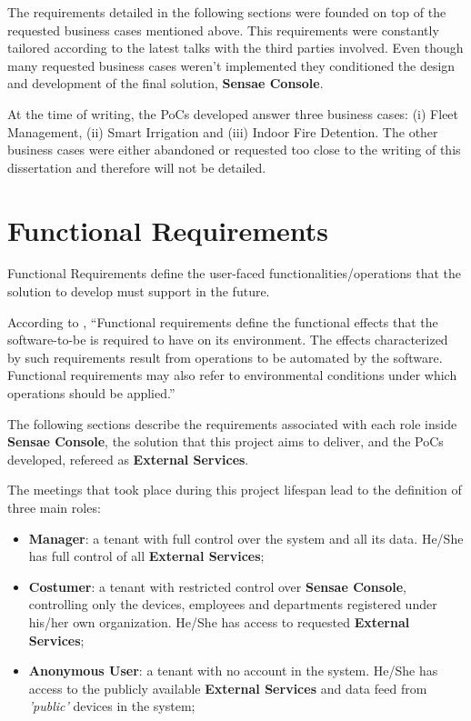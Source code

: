 The requirements detailed in the following sections were founded on top of the requested business cases mentioned above. This requirements were constantly tailored according to the latest talks with the third parties involved. Even though many requested business cases weren't implemented they conditioned the design and development of the final solution, \textbf{Sensae Console}.

At the time of writing, the \gls{PoC}s developed answer three business cases: (i) Fleet Management, (ii) Smart Irrigation and (iii) Indoor Fire Detention. The other business cases were either abandoned or requested too close to the writing of this dissertation and therefore will not be detailed.

\section{Functional Requirements}
\label{sec:requirements:functional}

Functional Requirements define the user-faced functionalities/operations that the solution to develop must support in the future.

According to \cite{van2009requirements}, ``Functional requirements define the functional effects that the software-to-be is required to have on its environment. The effects characterized by such requirements result from operations to be automated by the software. Functional requirements may also refer to environmental conditions under which operations should be applied.''

The following sections describe the requirements associated with each role inside \textbf{Sensae Console}, the solution that this project aims to deliver, and the \gls{PoC}s developed, refereed as \textbf{External Services}.

The meetings that took place during this project lifespan lead to the definition of three main roles:

\begin{itemize}
    \item \textbf{Manager}: a tenant with full control over the system and all its data. He/She has full control of all \textbf{External Services};
    \item \textbf{Costumer}: a tenant with restricted control over \textbf{Sensae Console}, controlling only the devices, employees and departments registered under his/her own organization. He/She has access to requested \textbf{External Services};
    \item \textbf{Anonymous User}: a tenant with no account in the system. He/She has access to the publicly available \textbf{External Services} and data feed from \textit{'public'} devices in the system;
\end{itemize}

